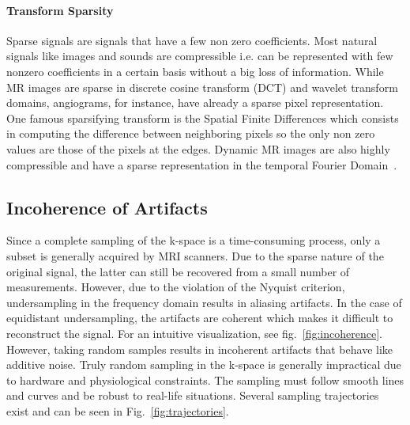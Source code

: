 \paragraph{Transform Sparsity}
 Sparse signals are signals that have a few non zero coefficients. Most natural signals like images and sounds are compressible i.e. can be represented with few nonzero coefficients in a certain basis without a big loss of information. While MR images are sparse in discrete cosine transform (DCT) and wavelet transform domains, angiograms, for instance, have already a sparse pixel representation.  One famous sparsifying transform is the Spatial Finite Differences which consists in computing the difference between neighboring pixels so the only non zero values are those of the pixels at the edges. Dynamic MR images are also highly compressible and have a sparse representation in the temporal Fourier Domain~\cite{parrish, lustig}.
 
\subsection{Incoherence of Artifacts}
Since a complete sampling of the k-space is a time-consuming process, only a subset is generally acquired by MRI scanners. Due to the sparse nature of the original signal, the latter can still be recovered from a small number of measurements. However, due to the violation of the Nyquist criterion, undersampling in the frequency domain results in aliasing artifacts. In the case of equidistant undersampling, the artifacts are coherent which makes it difficult to reconstruct the signal. For an intuitive visualization, see fig.~\ref{fig:incoherence}. However, taking random samples results in incoherent artifacts that behave like additive noise.
Truly random sampling in the k-space is generally impractical due to hardware and physiological constraints. The sampling must follow smooth lines and curves and be robust to real-life situations. Several sampling trajectories exist and can be seen in Fig.~\ref{fig:trajectories}.


